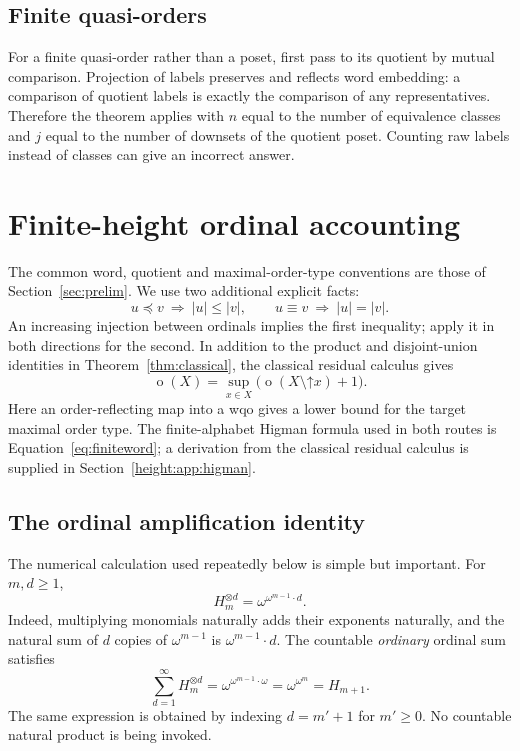 \documentclass[11pt,a4paper]{article}
\numberwithin{equation}{section}
\theoremstyle{definition}
\theoremstyle{remark}
\newcommand{\mot}{\mathop{o}}
\newcommand{\emb}{\preccurlyeq}
\newcommand{\up}{\mathord{\uparrow}}
\begin{document}
\subsection{Finite quasi-orders}
For a finite quasi-order rather than a poset, first pass to its quotient
by mutual comparison. Projection of labels preserves and reflects word
embedding: a comparison of quotient labels is exactly the comparison of
any representatives. Therefore the theorem applies with $n$ equal to the
number of equivalence classes and $j$ equal to the number of downsets of
the quotient poset. Counting raw labels instead of classes can give an
incorrect answer.


\section{Finite-height ordinal accounting}\label{height:sec:accounting}
The common word, quotient and maximal-order-type conventions are those of
Section~\ref{sec:prelim}. We use two additional explicit facts:
\begin{equation}\label{height:eq:lengthmonotone}
 u\emb v\ \Longrightarrow\ |u|\le |v|,
 \qquad u\equiv v\ \Longrightarrow\ |u|=|v|.
\end{equation}
An increasing injection between ordinals implies the first inequality;
apply it in both directions for the second. In addition to the product
and disjoint-union identities in Theorem~\ref{thm:classical}, the classical
residual calculus gives
\begin{equation}\label{height:eq:wqocalculus}
 \mot(X)=\sup_{x\in X}\bigl(\mot(X\setminus\up x)+1\bigr).
\end{equation}
Here an order-reflecting map into a wqo gives a lower bound for the target
maximal order type. The finite-alphabet Higman formula used in both routes
is Equation~\eqref{eq:finiteword}; a derivation from the classical residual
calculus is supplied in Section~\ref{height:app:higman}.

\subsection{The ordinal amplification identity}

The numerical calculation used repeatedly below is simple but important.
For $m,d\ge1$,
\begin{equation}\label{height:eq:power}
  H_m^{\otimes d}=\omega^{\omega^{m-1}\cdot d}.
\end{equation}
Indeed, multiplying monomials naturally adds their exponents naturally,
and the natural sum of $d$ copies of $\omega^{m-1}$ is
$\omega^{m-1}\cdot d$. The countable \emph{ordinary} ordinal sum satisfies
\begin{equation}\label{height:eq:amplify}
  \sum_{d=1}^{\infty}H_m^{\otimes d}
  =\omega^{\omega^{m-1}\cdot\omega}
  =\omega^{\omega^m}=H_{m+1}.
\end{equation}
The same expression is obtained by indexing $d=m'+1$ for $m'\ge0$.
No countable natural product is being invoked.
\end{document}
